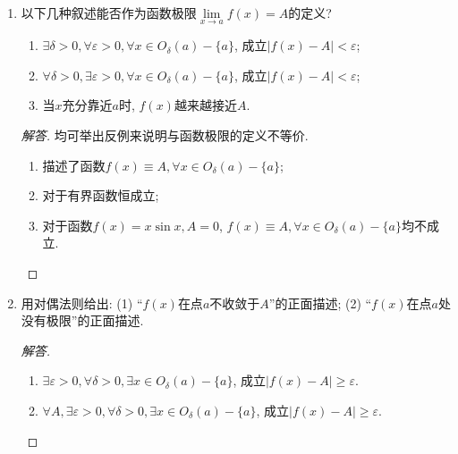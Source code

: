 \documentclass[a4paper,11pt,twoside]{ctexbook}
\begin{document}
\begin{enumerate}
\begin{proof}[解答]
\begin{enumerate}[(1)]
			            $\Leftarrow$由于$\lim\limits_{n\to\infty} \dfrac{1}{n}=0$, 故对于$\forall\delta>0, \exists n_0\in\mathbf{N}_{+}$使得$\dfrac{1}{n}<\delta$. $\forall\varepsilon>0, \exists\delta>0, \forall x\in O_{\delta}(a)-\{a\}$, 成立$|f(x)-A|<\varepsilon$. 取合适的$n_0$使得$\dfrac{1}{n_0}<\delta$, 则对于$\forall x\in O_{\frac{1}{n}}(a)-\{a\}\subset O_{\delta}(a)-\{a\}$, 成立$|f(x)-A|<\varepsilon$. \qedhere
		      \end{enumerate}
	      \end{proof}
	\item 以下几种叙述能否作为函数极限$\lim\limits_{x\to a} f(x)=A$的定义?
	      \begin{enumerate}[(1)]
		      \item $\exists\delta>0, \forall\varepsilon>0, \forall x\in O_{\delta}(a)-\{a\}$, 成立$|f(x)-A|<\varepsilon$;
		      \item $\forall\delta>0, \exists\varepsilon>0, \forall x\in O_{\delta}(a)-\{a\}$, 成立$|f(x)-A|<\varepsilon$;
		      \item 当$x$充分靠近$a$时, $f(x)$越来越接近$A$.
	      \end{enumerate}
	      \begin{proof}[解答]
		      均可举出反例来说明与函数极限的定义不等价.
		      \begin{enumerate}[(1)]
			      \item 描述了函数$f(x)\equiv A, \forall x\in O_{\delta}(a)-\{a\}$;
			      \item 对于有界函数恒成立;
			      \item 对于函数$f(x)=x\sin{x}, A=0$, $f(x)\equiv A, \forall x\in O_{\delta}(a)-\{a\}$均不成立. \qedhere
		      \end{enumerate}
	      \end{proof}

	\item 用对偶法则给出: (1) ``$f(x)$在点$a$不收敛于$A$''的正面描述; (2) ``$f(x)$在点$a$处没有极限''的正面描述.
	      \begin{proof}[解答]
		      \begin{enumerate}[(1)]
			      \item $\exists\varepsilon>0, \forall \delta>0, \exists x\in O_{\delta}(a)-\{a\}$, 成立$|f(x)-A|\geqslant\varepsilon$.
			      \item $\forall A, \exists\varepsilon>0, \forall \delta>0, \exists x\in O_{\delta}(a)-\{a\}$, 成立$|f(x)-A|\geqslant\varepsilon$.
		      \end{enumerate}
	      \end{proof}


\end{enumerate}
\end{document}
